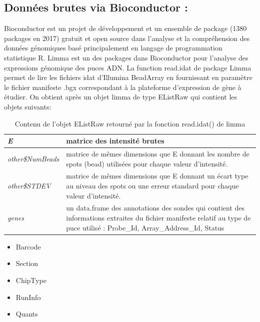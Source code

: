 \documentclass[a4paper,10pt]{article}
\begin{document}
\subsection{ Données brutes via Bioconductor :}
Bioconductor est un projet de développement et un ensemble de package (1380 packages en 2017)  gratuit et open source dans l’analyse et la compréhension des données génomiques basé principalement en langage de programmation statistique R.
Limma est un des packages dans Bioconductor pour l’analyse des expressions génomique des puces  ADN. La function read.idat de package Limma permet de lire les fichiers idat d’Illumina BeadArray en fournissant en paramètre le fichier manifeste .bgx correspondant à la plateforme d’expression de gène à étudier.
On obtient après un objet limma de type EListRaw  qui contient les objets suivants:
\begin{table}[!h]
\begin{tabular}{|l|p{9cm}|}
\hline
 \emph{E} & matrice des intensité brutes\\
\hline
\emph{other\$NumBeads }   &  matrice de mêmes dimensions que E donnant les nombre de spots (bead) utilisées pour chaque valeur d'intensité. \\
\hline 
\emph{other\$STDEV} & matrice de mêmes dimensions que E donnant un écart type au niveau des spots ou une erreur standard pour chaque valeur d'intensité.\\
\hline
\emph{genes} & un data.frame des annotations des sondes qui contient des informations extraites du fichier manifeste relatif au type de puce utilisé : Probe\_Id, Array\_Address\_Id, Status
\\
\hline
\end{tabular}
\caption{Contenu de l'objet EListRaw retourné par la fonction read.idat() de limma}
\label{EListRaw}
\end{table}
\begin{itemize}
 \item  Barcode  
\item  Section 
\item  ChipType 
\item  RunInfo 
\item  Quants
\end{itemize}
\end{document}
